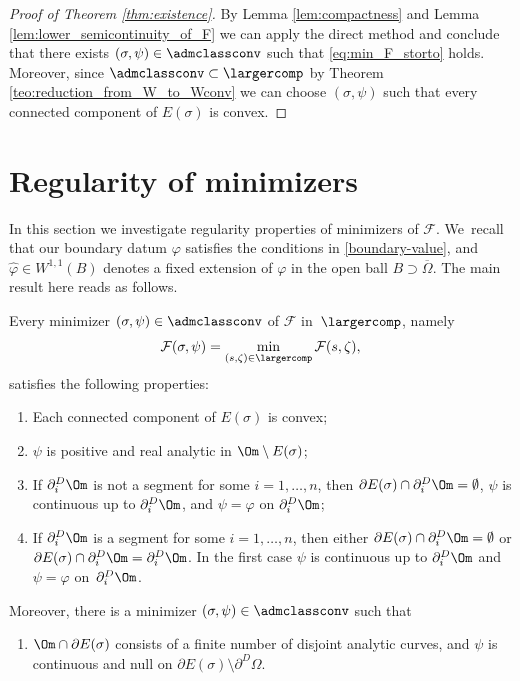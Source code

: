 \begin{proof}[Proof of Theorem \ref{thm:existence}]
By Lemma \ref{lem:compactness} and Lemma \ref{lem:lower_semicontinuity_of_F} we can apply the direct method and conclude that there exists $(\sigma, \psi)\in\admclassconv$ such that
\eqref{eq:min_F_storto} holds. Moreover, since $\admclassconv\subset\largercomp$ by Theorem \eqref{teo:reduction_from_W_to_Wconv} we can choose $(\sigma,\psi)$ such that every connected component of $E(\sigma)$ is convex.
\end{proof}

\section{Regularity of minimizers}
\label{sec:regularity_of_minimizers}

In this section we investigate regularity properties of
minimizers of $\mathcal F$. We~recall that our boundary datum
$\varphi$
satisfies the conditions
in \eqref{boundary-value}, and $\widehat\varphi\in W^{1,1}(B)$ denotes a
fixed extension of $\varphi$ in the open ball $B\supset\overline\Omega$.
The main result here reads as follows.
\begin{theorem}
\label{teo:structure_of_minimizers}
Every minimizer $(\sigma,\psi)\in\admclassconv$ of $\mathcal F$ in~$\largercomp$, namely
\begin{equation*}
{\mathcal{F}}(\sigma,\psi)=\min_{(s,\zeta)\in\largercomp}
{\mathcal{F}}(s,\zeta),
\end{equation*}
satisfies the following properties:
\begin{enumerate}[{\rm(1)},wide]
\item\label{1.}
Each connected component of $E(\sigma)$ is convex;
\item\label{2.} $\psi$ is positive and real analytic
in $\Om\setminus E(\sigma)$;
\item\label{3.} If $\partial^D_i\Om$ is not
a segment
for some $i=1,\dots,n$, then $\partial E(\sigma)\cap
\partial_i^D\Om=\emptyset$, $\psi$ is continuous up to $\partial_i^D\Om$, and
$\psi=\varphi$ on $\partial_i^D\Om$;
\item\label{4.} If $\partial^D_i\Om$ is a segment for some $i=1,\dots,n$, then either $\partial E(\sigma)\cap
\partial_i^D\Om=\emptyset$ or $\partial E(\sigma)\cap
\partial_i^D\Om=\partial_i^D\Om$. In the first case $\psi$
is continuous up to $\partial_i^D\Om$ and
$\psi=\varphi$ on~$\partial_i^D\Om$.
\end{enumerate}
Moreover, there is a minimizer $(\sigma,\psi)\in\admclassconv$ such that
\begin{enumerate}[{\rm(5)},wide]
\item\label{5.}
$\Om\cap \partial E(\sigma)$ consists of a finite number of disjoint analytic curves, and $\psi$ is continuous and null on $\partial E(\sigma)\setminus \partial^D\Omega$.
\end{enumerate}
\end{theorem}

